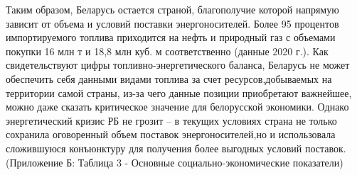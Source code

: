 \documentclass[14pt,a4paper]{article}
\begin{document}
    Таким образом, Беларусь остается страной, благополучие которой напрямую зависит от объема и условий поставки энергоносителей.
    Более 95 процентов импортируемого топлива приходится на нефть и природный газ с объемами покупки 16 млн т и 18,8 млн куб. м соответственно (данные 2020 г.).
    Как свидетельствуют цифры топливно-энергетического баланса, Беларусь не может обеспечить себя данными видами топлива за счет ресурсов,добываемых на территории самой страны, из-за чего данные позиции приобретают важнейшее, можно даже сказать критическое значение для белорусской экономики.
    Однако энергетический кризис РБ не грозит – в текущих условиях страна не только сохранила оговоренный объем поставок энергоносителей,но и использовала сложившуюся конъюнктуру для получения более выгодных условий поставок. (Приложение Б: Таблица 3 - Основные социально-экономические показатели)
\end{document}
